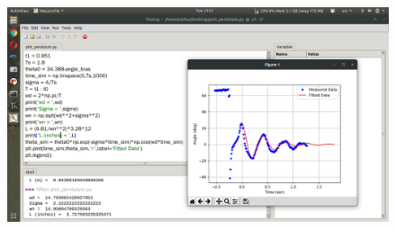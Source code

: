 \begin{figure}[H]
  \begin{center}
    \includegraphics[width=\textwidth]{Figures/oscillation_plots2.png}
  \end{center}
\end{figure}
